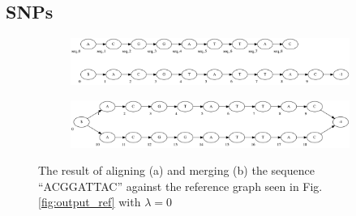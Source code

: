 \documentclass[thesis.tex]{subfiles}
\begin{document}
\subsection{SNPs}
\begin{figure}[H]
  \begin{subfigure}[t]{\textwidth}
    \begin{mdframed}
      \includegraphics[width=\textwidth]{outputs/snp-no-margin-alignment.png}
    \end{mdframed}
    \subcaption{}
  \end{subfigure}
  \begin{subfigure}[t]{\textwidth}
    \begin{mdframed}
      \includegraphics[width=\textwidth]{outputs/snp-no-margin-merge.png}
    \end{mdframed}
    \subcaption{}
  \end{subfigure}
 \caption{The result of aligning (a) and merging (b) the sequence ``ACGGATTAC'' against the reference graph seen in Fig. \ref{fig:output_ref} with $\lambda=0$}
\end{figure}
\end{document}
